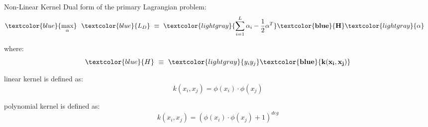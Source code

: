 \begin{frame}[fragile]{Non-Linear Kernel}
  Dual form of the primary Lagrangian problem:
  \newline
  \begin{equation*}
    \begin{split}
      \textcolor{blue}{\max_{\alpha}}\ &\ \textcolor{blue}{L_D}\ 
      \equiv\ 
      \textcolor{lightgray}{\sum_{i=1}^{L} \alpha_i - \frac{1}{2} \alpha^T} 
      \mathbf{\textcolor{blue}{H}}
      \textcolor{lightgray}{\alpha}
    \end{split}
  \end{equation*}

  where:
  \newline
  \begin{equation*}
    \textcolor{blue}{H}\ \equiv\ \textcolor{lightgray}{y_i y_j} \mathbf{\textcolor{blue}{k(x_i, x_j)}}
  \end{equation*}

  linear kernel is defined as:
  \begin{equation*}
    k(x_i, x_j) = \phi(x_i) \cdot \phi(x_j)
  \end{equation*}

  polynomial kernel is defined as:
  \begin{equation*}
    k(x_i, x_j) = (\phi(x_i) \cdot \phi(x_j) + 1)^{deg}
  \end{equation*}
\end{frame}

